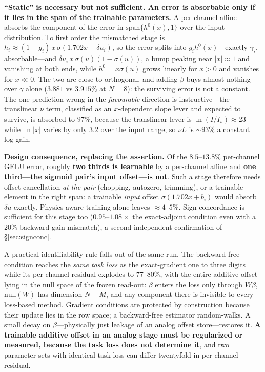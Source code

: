 \documentclass[11pt]{article}
\begin{document}
\textbf{``Static'' is necessary but not sufficient. An error is absorbable only if it lies in the span of the trainable parameters.} A per-channel affine absorbs the component of the error in $\mathrm{span}\{h^0(x), 1\}$ over the input distribution. To first order the mismatched stage is $h_i \approx (1+g_i)\,x\,\sigma(1.702x + \delta u_i)$, so the error splits into $g_i h^0(x)$---exactly $\gamma_i$, absorbable---and $\delta u_i\, x\,\sigma(u)(1-\sigma(u))$, a bump peaking near $|x|\approx1$ and vanishing at both ends, while $h^0 = x\sigma(u)$ grows linearly for $x>0$ and vanishes for $x \ll 0$. The two are close to orthogonal, and adding $\beta$ buys almost nothing over $\gamma$ alone ($3.881$ vs $3.915\%$ at $N=8$): the surviving error is not a constant. The one prediction wrong in the \textit{favourable} direction is instructive---the translinear $\nu$ term, classified as an $x$-dependent slope lever and expected to survive, is absorbed to $97\%$, because the translinear lever is $\ln(I/I_s)\approx23$ while $\ln|x|$ varies by only $3.2$ over the input range, so $\nu L$ is ${\sim}93\%$ a constant log-gain.

\textbf{Design consequence, replacing the assertion.} Of the $8.5$--$13.8\%$ per-channel GELU error, roughly \textbf{two thirds is learnable} by a per-channel affine and \textbf{one third---the sigmoid pair's input offset---is not}. Such a stage therefore needs offset cancellation \textit{at the pair} (chopping, autozero, trimming), or a trainable element in the right span: a trainable \textit{input} offset $\sigma(1.702x + b_i)$ would absorb $\delta u$ exactly. Physics-aware training alone leaves ${\approx}4$--$5\%$. Sign concordance is sufficient for this stage too ($0.95$--$1.08\times$ the exact-adjoint condition even with a $20\%$ backward gain mismatch), a second independent confirmation of \S\ref{sec:signconc}.

A practical identifiability rule falls out of the same run. The backward-free condition reaches the \textit{same task loss} as the exact-gradient one to three digits while its per-channel residual explodes to $77$--$80\%$, with the entire additive offset lying in the null space of the frozen read-out: $\beta$ enters the loss only through $W\beta$, $\mathrm{null}(W)$ has dimension $N-M$, and any component there is invisible to every loss-based method. Gradient conditions are protected by construction because their update lies in the row space; a backward-free estimator random-walks. A small decay on $\beta$---physically just leakage of an analog offset store---restores it. \textbf{A trainable additive offset in an analog stage must be regularized or measured, because the task loss does not determine it}, and two parameter sets with identical task loss can differ twentyfold in per-channel residual.
\end{document}
